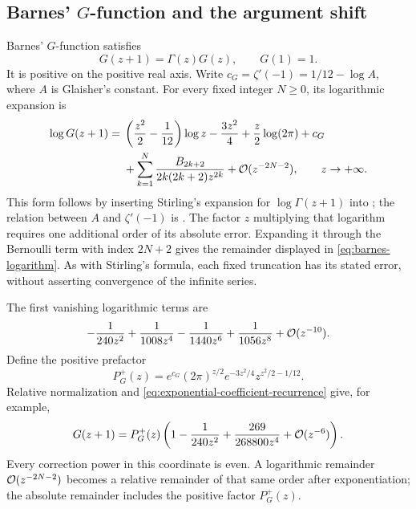\subsection{Barnes' \texorpdfstring{$G$}{G}-function and the argument shift}

Barnes' $G$-function satisfies
\begin{equation}
 G(z+1)=\Gamma(z)G(z),\qquad G(1)=1.
 \label{eq:barnes-recurrence}
\end{equation}
It is positive on the positive real axis. Write
$c_G=\zeta'(-1)=1/12-\log A$, where $A$ is Glaisher's constant.
For every fixed integer $N\ge0$, its logarithmic expansion is
\begin{equation}
\begin{aligned}
 \log G(z+1)
  ={}&\left(\frac{z^2}{2}-\frac1{12}\right)\log z
      -\frac{3z^2}{4}+\frac z2\log(2\pi)+c_G\\
    &+\sum_{k=1}^{N}
       \frac{B_{2k+2}}{2k(2k+2)z^{2k}}
       +\mathcal O(z^{-2N-2}),\qquad z\to+\infty.
\end{aligned}
 \label{eq:barnes-logarithm}
\end{equation}
This form follows by inserting Stirling's expansion for
$\log\Gamma(z+1)$ into \cite[(5.17.5)]{dlmf}; the relation between
$A$ and $\zeta'(-1)$ is \cite[(5.17.7)]{dlmf}. The factor $z$ multiplying
that logarithm requires one additional order of its absolute error.
Expanding it through the Bernoulli term with index $2N+2$ gives the
remainder displayed in \eqref{eq:barnes-logarithm}. As with Stirling's
formula, each fixed truncation has its stated error, without asserting
convergence of the infinite series.

The first vanishing logarithmic terms are
\begin{equation}
 -\frac1{240z^2}+\frac1{1008z^4}
 -\frac1{1440z^6}+\frac1{1056z^8}+\mathcal O(z^{-10}).
 \label{eq:barnes-logarithmic-corrections}
\end{equation}
Define the positive prefactor
\begin{equation}
 P_G^+(z)=e^{c_G}(2\pi)^{z/2}
          e^{-3z^2/4}z^{z^2/2-1/12}.
 \label{eq:barnes-shifted-prefactor}
\end{equation}
Relative normalization and
\eqref{eq:exponential-coefficient-recurrence} give, for example,
\begin{equation}
 G(z+1)=P_G^+(z)
 \left(1-\frac1{240z^2}+\frac{269}{268800z^4}
       +\mathcal O(z^{-6})\right).
 \label{eq:barnes-shifted-expansion}
\end{equation}
Every correction power in this coordinate is even. A logarithmic
remainder $\mathcal O(z^{-2N-2})$ becomes a relative remainder of that
same order after exponentiation; the absolute remainder includes
the positive factor $P_G^+(z)$.

